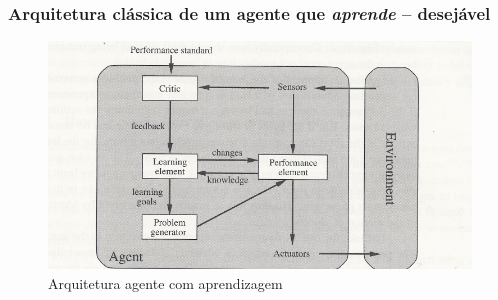 \begin{frame}

  \frametitle{Arquitetura clássica de um agente que \textit{aprende} -- desejável}
    
\begin{figure}[!ht]
\centering
\includegraphics[height =.6\textheight,width=.7\textwidth]{figuras/agent-learning.pdf}
\caption{Arquitetura agente com aprendizagem}
\label{ag_01}
\end{figure}
    
\end{frame}

